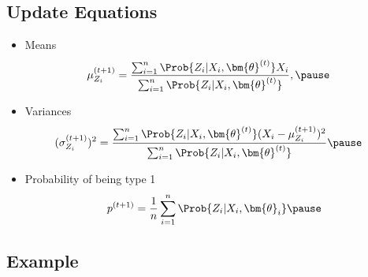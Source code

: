 \begin{slide}
\section[-2]{Update Equations}

\begin{PauseHighLight}
  \begin{itemize}
  \item Means
    \begin{align*}
      \mu_{Z_i}^{(t+1)}
      &= \frac{ \sum_{i=1}^n \Prob{Z_i|X_i,\bm{\theta}^{(t)}} X_i}
        {\sum_{i=1}^n \Prob{Z_i|X_i,\bm{\theta}^{(t)}}},\pause
    \end{align*}
\item Variances
  \begin{align*}
    (\sigma_{Z_i}^{(t+1)})^2
      &= \frac{ \sum_{i=1}^n \Prob{Z_i|X_i,\bm{\theta}^{(t)}}
        (X_i-\mu^{(t+1)}_{Z_i})^2}
        {\sum_{i=1}^n \Prob{Z_i|X_i,\bm{\theta}^{(t)}}}\pause
  \end{align*}
  \item Probability of being type 1
    \begin{align*}
      p^{(t+1)} = \frac{1}{n} \sum_{i=1}^n \Prob{Z_i|X_i, \bm{\theta}_i}\pause
    \end{align*}
  \end{itemize}
\end{PauseHighLight}
  
\end{slide}



\begin{slide}
\section{Example}
\pause
\pb{}
\begin{center}
  \pause
\end{center}
\end{slide}



